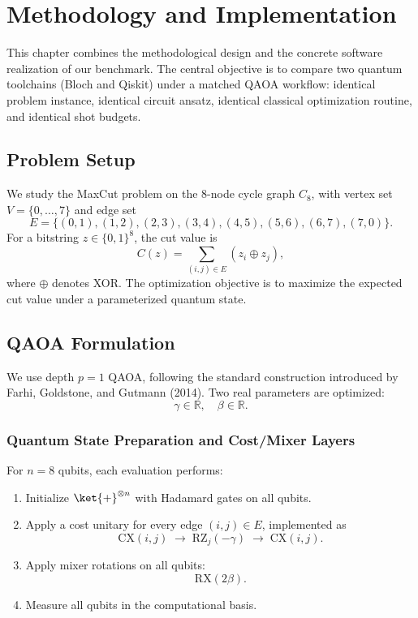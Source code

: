 \chapter{Methodology and Implementation}
\label{chap:methodology_implementation}

This chapter combines the methodological design and the concrete software realization of our benchmark.
The central objective is to compare two quantum toolchains (Bloch and Qiskit) under a matched QAOA workflow:
identical problem instance, identical circuit ansatz, identical classical optimization routine, and identical shot budgets.

\section{Problem Setup}
\label{sec:problem_setup}

We study the MaxCut problem on the 8-node cycle graph \(C_8\), with vertex set
\(V = \{0,\dots,7\}\) and edge set
\[
E = \{(0,1),(1,2),(2,3),(3,4),(4,5),(5,6),(6,7),(7,0)\}.
\]
For a bitstring \(z \in \{0,1\}^{8}\), the cut value is
\[
C(z) = \sum_{(i,j)\in E} (z_i \oplus z_j),
\]
where \(\oplus\) denotes XOR.
The optimization objective is to maximize the expected cut value under a parameterized quantum state.

\section{QAOA Formulation}
\label{sec:qaoa_formulation}

We use depth \(p=1\) QAOA, following the standard construction introduced by Farhi, Goldstone, and Gutmann (2014).
Two real parameters are optimized:
\[
\gamma \in \mathbb{R}, \quad \beta \in \mathbb{R}.
\]

\subsection{Quantum State Preparation and Cost/Mixer Layers}

For \(n=8\) qubits, each evaluation performs:
\begin{enumerate}
    \item Initialize \(\ket{+}^{\otimes n}\) with Hadamard gates on all qubits.
    \item Apply a cost unitary for every edge \((i,j)\in E\), implemented as
    \[
    \mathrm{CX}(i,j)\;\rightarrow\; \mathrm{RZ}_j(-\gamma)\;\rightarrow\; \mathrm{CX}(i,j).
    \]
    \item Apply mixer rotations on all qubits:
    \[
    \mathrm{RX}(2\beta).
    \]
    \item Measure all qubits in the computational basis.
\end{enumerate}


